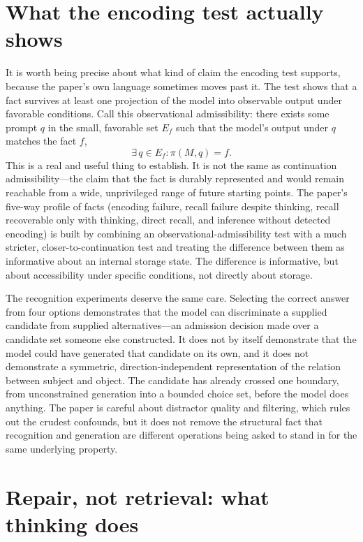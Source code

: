\documentclass[11pt]{article}
\begin{document}
\section{What the encoding test actually shows}

It is worth being precise about what kind of claim the encoding test supports, because the paper's own language sometimes moves past it. The test shows that a fact survives at least one projection of the model into observable output under favorable conditions. Call this observational admissibility: there exists some prompt $q$ in the small, favorable set $E_f$ such that the model's output under $q$ matches the fact $f$,
\[
\exists\, q \in E_f : \pi(M, q) = f.
\]
This is a real and useful thing to establish. It is not the same as continuation admissibility---the claim that the fact is durably represented and would remain reachable from a wide, unprivileged range of future starting points. The paper's five-way profile of facts (encoding failure, recall failure despite thinking, recall recoverable only with thinking, direct recall, and inference without detected encoding) is built by combining an observational-admissibility test with a much stricter, closer-to-continuation test and treating the difference between them as informative about an internal storage state. The difference is informative, but about accessibility under specific conditions, not directly about storage.

The recognition experiments deserve the same care. Selecting the correct answer from four options demonstrates that the model can discriminate a supplied candidate from supplied alternatives---an admission decision made over a candidate set someone else constructed. It does not by itself demonstrate that the model could have generated that candidate on its own, and it does not demonstrate a symmetric, direction-independent representation of the relation between subject and object. The candidate has already crossed one boundary, from unconstrained generation into a bounded choice set, before the model does anything. The paper is careful about distractor quality and filtering, which rules out the crudest confounds, but it does not remove the structural fact that recognition and generation are different operations being asked to stand in for the same underlying property.

\section{Repair, not retrieval: what thinking does}
\end{document}
